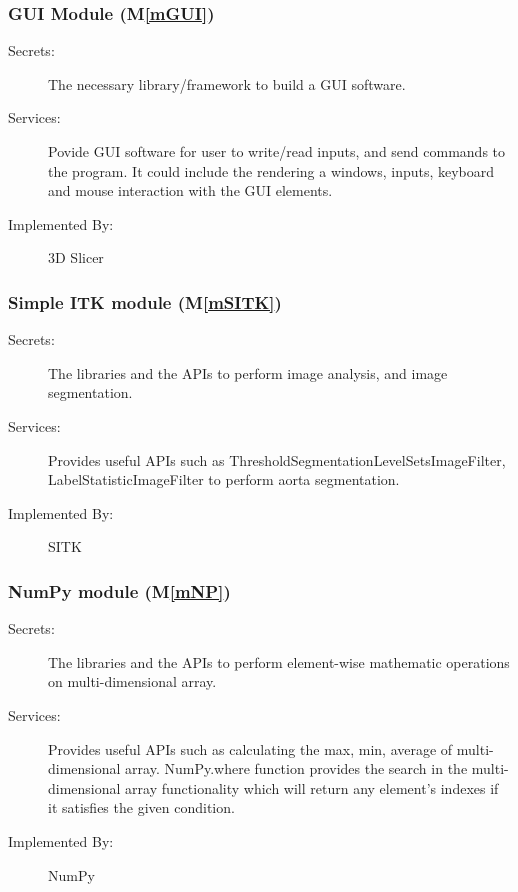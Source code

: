 \documentclass[12pt, titlepage]{article}
\newcommand{\mref}[1]{M\ref{#1}}
\begin{document}
\subsubsection{GUI Module (\mref{mGUI})}
\begin{description}
\item[Secrets:]The necessary library/framework to build a GUI software.
\item[Services:]Povide GUI software for user to write/read inputs, and send commands to the program. It could include the rendering a windows, inputs, keyboard and mouse interaction with the GUI elements.
\item[Implemented By:] 3D Slicer
\end{description}


\subsubsection{Simple ITK module (\mref{mSITK})}
\begin{description}
\item[Secrets:] The libraries and the APIs to perform image analysis, and image segmentation.
\item[Services:] Provides useful APIs such as ThresholdSegmentationLevelSetsImageFilter, LabelStatisticImageFilter to perform aorta segmentation.
\item[Implemented By:] SITK
\end{description}

\subsubsection{NumPy module (\mref{mNP})}
\begin{description}
\item[Secrets:] The libraries and the APIs to perform element-wise mathematic operations on multi-dimensional array.
\item[Services:] Provides useful APIs such as calculating the max, min, average of multi-dimensional array. NumPy.where function provides the search in the multi-dimensional array functionality which will return any element's indexes if it satisfies the given condition.
\item[Implemented By:] NumPy
\end{description}
\end{document}
